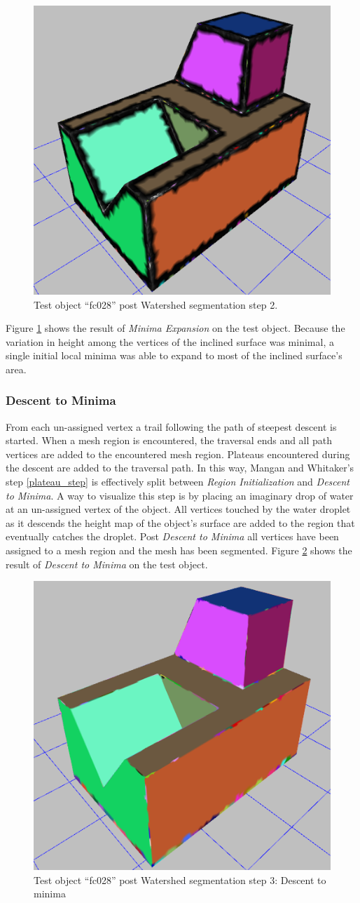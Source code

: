 \begin{figure}[htb]
	\centering
	\includegraphics[width=0.5\linewidth]{../resources/watershed/fc028_WS2.png}
\caption{
Test object ``fc028'' post Watershed segmentation step 2.
}
	\label{fig:ws_2}
\end{figure}

Figure \ref{fig:ws_2} shows the result of \textit{Minima Expansion} on the test object.
Because the variation in height among the vertices of the inclined surface was minimal, a single initial local minima was able to expand to most of the inclined surface's area.

\subsubsection{Descent to Minima}
From each un-assigned vertex a trail following the path of steepest descent is started.
When a mesh region is encountered, the traversal ends and all path vertices are added to the encountered mesh region.
Plateaus encountered during the descent are added to the traversal path.
In this way, Mangan and Whitaker's step \ref{plateau_step} is effectively split between \textit{Region Initialization} and \textit{Descent to Minima}.
A way to visualize this step is by placing an imaginary drop of water at an un-assigned vertex of the object.
All vertices touched by the water droplet as it descends the height map of the object's surface are added to the region that eventually catches the droplet.
Post \textit{Descent to Minima} all vertices have been assigned to a mesh region and the mesh has been segmented.
Figure \ref{fig:ws_3} shows the result of \textit{Descent to Minima} on the test object.

\begin{figure}[htb]
	\centering
	\includegraphics[width=0.5\linewidth]{../resources/watershed/fc028_WS3.png}
\caption{
Test object ``fc028'' post Watershed segmentation step 3: Descent to minima
}
	\label{fig:ws_3}
\end{figure}

